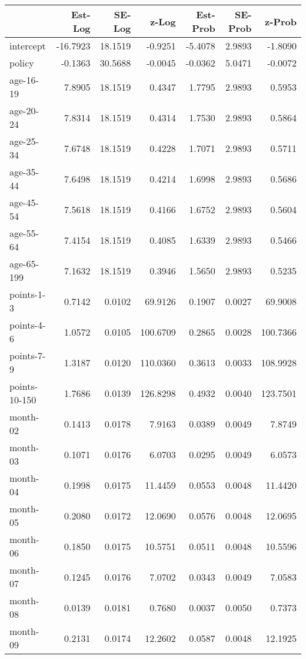 \documentclass[10pt]{article}
\begin{document}
\begin{table}[ht]
\centering
\begin{tabular}{lrrrrrr}
  \hline
 & Est-Log & SE-Log & z-Log & Est-Prob & SE-Prob & z-Prob \\ 
  \hline
intercept & -16.7923 & 18.1519 & -0.9251 & -5.4078 & 2.9893 & -1.8090 \\ 
  policy & -0.1363 & 30.5688 & -0.0045 & -0.0362 & 5.0471 & -0.0072 \\ 
  age-16-19 & 7.8905 & 18.1519 & 0.4347 & 1.7795 & 2.9893 & 0.5953 \\ 
  age-20-24 & 7.8314 & 18.1519 & 0.4314 & 1.7530 & 2.9893 & 0.5864 \\ 
  age-25-34 & 7.6748 & 18.1519 & 0.4228 & 1.7071 & 2.9893 & 0.5711 \\ 
  age-35-44 & 7.6498 & 18.1519 & 0.4214 & 1.6998 & 2.9893 & 0.5686 \\ 
  age-45-54 & 7.5618 & 18.1519 & 0.4166 & 1.6752 & 2.9893 & 0.5604 \\ 
  age-55-64 & 7.4154 & 18.1519 & 0.4085 & 1.6339 & 2.9893 & 0.5466 \\ 
  age-65-199 & 7.1632 & 18.1519 & 0.3946 & 1.5650 & 2.9893 & 0.5235 \\ 
  points-1-3 & 0.7142 & 0.0102 & 69.9126 & 0.1907 & 0.0027 & 69.9008 \\ 
  points-4-6 & 1.0572 & 0.0105 & 100.6709 & 0.2865 & 0.0028 & 100.7366 \\ 
  points-7-9 & 1.3187 & 0.0120 & 110.0360 & 0.3613 & 0.0033 & 108.9928 \\ 
  points-10-150 & 1.7686 & 0.0139 & 126.8298 & 0.4932 & 0.0040 & 123.7501 \\ 
  month-02 & 0.1413 & 0.0178 & 7.9163 & 0.0389 & 0.0049 & 7.8749 \\ 
  month-03 & 0.1071 & 0.0176 & 6.0703 & 0.0295 & 0.0049 & 6.0573 \\ 
  month-04 & 0.1998 & 0.0175 & 11.4459 & 0.0553 & 0.0048 & 11.4420 \\ 
  month-05 & 0.2080 & 0.0172 & 12.0690 & 0.0576 & 0.0048 & 12.0695 \\ 
  month-06 & 0.1850 & 0.0175 & 10.5751 & 0.0511 & 0.0048 & 10.5596 \\ 
  month-07 & 0.1245 & 0.0176 & 7.0702 & 0.0343 & 0.0049 & 7.0583 \\ 
  month-08 & 0.0139 & 0.0181 & 0.7680 & 0.0037 & 0.0050 & 0.7373 \\ 
  month-09 & 0.2131 & 0.0174 & 12.2602 & 0.0587 & 0.0048 & 12.1925 \\ 

\end{tabular}
\end{table}
\end{document}
